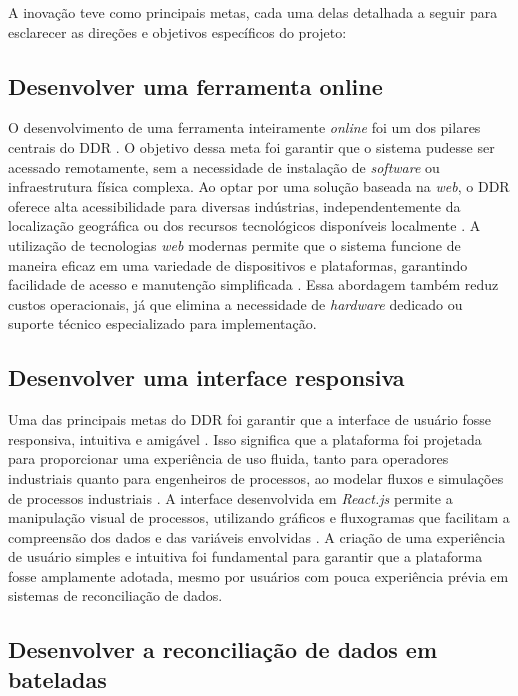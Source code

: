 A inovação teve como principais metas, cada uma delas detalhada a seguir para esclarecer as direções e objetivos específicos do projeto:

\subsection{Desenvolver uma ferramenta online}

O desenvolvimento de uma ferramenta inteiramente \textit{online} foi um dos pilares centrais do DDR \cite{bilco}. O objetivo dessa meta foi garantir que o sistema pudesse ser acessado remotamente, sem a necessidade de instalação de \textit{software} ou infraestrutura física complexa. Ao optar por uma solução baseada na \textit{web}, o DDR oferece alta acessibilidade para diversas indústrias, independentemente da localização geográfica ou dos recursos tecnológicos disponíveis localmente \cite{industrynew}. A utilização de tecnologias \textit{web} modernas permite que o sistema funcione de maneira eficaz em uma variedade de dispositivos e plataformas, garantindo facilidade de acesso e manutenção simplificada \cite{javascriptframework}. Essa abordagem também reduz custos operacionais, já que elimina a necessidade de \textit{hardware} dedicado ou suporte técnico especializado para implementação.

\subsection{Desenvolver uma interface responsiva}

Uma das principais metas do DDR foi garantir que a interface de usuário fosse responsiva, intuitiva e amigável \cite{frontendperfomance}. Isso significa que a plataforma foi projetada para proporcionar uma experiência de uso fluida, tanto para operadores industriais quanto para engenheiros de processos, ao modelar fluxos e simulações de processos industriais \cite{reactjs}. A interface desenvolvida em \textit{React.js} permite a manipulação visual de processos, utilizando gráficos e fluxogramas que facilitam a compreensão dos dados e das variáveis envolvidas \cite{eloquentjavascript}. A criação de uma experiência de usuário simples e intuitiva foi fundamental para garantir que a plataforma fosse amplamente adotada, mesmo por usuários com pouca experiência prévia em sistemas de reconciliação de dados.

\subsection{Desenvolver a reconciliação de dados em bateladas}

